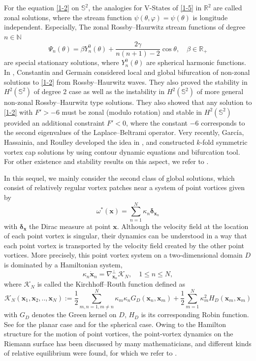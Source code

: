\documentclass[12pt,reqno]{amsart}
\numberwithin{equation}{section}
\theoremstyle{definition}
\theoremstyle{remark}
\begin{document}
    For the equation \eqref{1-2} on $\mathbb S^2$, the analogies for V-States of \eqref{1-5} in $\mathbb R^2$ are called zonal solutions, 
    where the stream function $\psi(\theta,\varphi)=\psi(\theta)$ is longitude independent. 
    Especially, The zonal Rossby--Haurwitz stream functions of degree $n\in\mathbb N$ 
    $$\Psi_n(\theta)=\beta Y_n^0(\theta)+\frac{2\gamma}{n(n+1)-2}\cos\theta, \quad \beta\in\mathbb R_+$$
    are special stationary solutions, where $Y_n^0(\theta)$ are spherical harmonic functions. 
    In \cite{CG}, Constantin and Germain considered local and global bifurcation of non-zonal solutions to \eqref{1-2} from Rossby--Haurwitz waves. 
    They also proved the stability in $H^2(\mathbb S^2)$ of degree $2$ case as well as the instability in $H^2(\mathbb S^2)$ of 
    more general non-zonal Rossby--Haurwitz type solutions. They also showed that any solution to \eqref{1-2} with $F'>-6$ must be zonal (modulo rotation)
    and stable in $H^2(\mathbb S^2)$ provided an additional constraint $F' < 0$, where the constant $-6$ corresponds to the second eigenvalues 
    of the Laplace--Beltrami operator. Very recently, Garc\'ia, Hassainia, and Roulley \cite{GHR} developed the idea in \cite{Hmi}, and constructed $k$-fold
     symmetric vortex cap solutions by using contour dynamic equations and bifurcation tool. For other existence and stability results on this aspect, 
     we refer to \cite{CWZ, Cap, Nua}.
    
    In this sequel, we mainly consider the second class of global solutions, which consist of relatively regular vortex patches 
    near a system of point vortices given by $$\omega^*(\boldsymbol x)=\sum_{n=1}^N\kappa_n\boldsymbol \delta_{\boldsymbol x_n}$$
    with $\boldsymbol \delta_{\boldsymbol x}$ the Dirac measure at point $\boldsymbol x$. Although the velocity field at the location of each point vortex is singular,
    their dynamics can be understood in a way that each point vortex is transported by the velocity field created by the other point vortices. 
    More precisely, this point vortex system on a two-dimensional domain $D$ is dominated by a Hamiltonian system, 
    \begin{equation*}
    	\kappa_n\boldsymbol \dot {\boldsymbol x}_n=\nabla^{\perp}_{\boldsymbol x_n}\mathcal K_N, \quad 1\le n\le N,
    \end{equation*}
    where $\mathcal K_N$ is called the Kirchhoff--Routh function defined as
    \begin{equation*}
    	\mathcal K_N(\boldsymbol x_1,\boldsymbol x_2,..,\boldsymbol x_N):=\frac{1}{2}\sum_{m,n=1,m\neq n}^N\kappa_m\kappa_nG_D(\boldsymbol x_n,\boldsymbol x_m)+\frac{1}{2}\sum_{m=1}^N\kappa_m^2H_D(\boldsymbol x_m,\boldsymbol x_m)
    \end{equation*}
    with $G_D$ denotes the Green kernel on $D$, $H_D$ is its corresponding Robin function. See \cite{Lin1, Lin2} for the planar case 
    and \cite{Drit} for the spherical case. Owing to the Hamilton structure for the motion of point vortices, the point-vortex dynamics 
    on the Riemann surface has been discussed by many mathematicians, and different kinds of relative equilibrium were found, 
    for which we refer to \cite{New0, New, Sakajo-Torus, Wang}.
    
\end{document}
